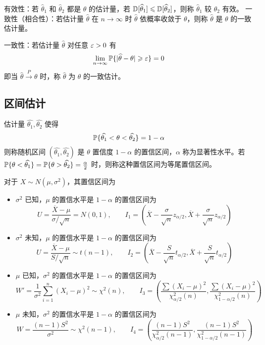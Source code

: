 有效性：若 $\widehat{\theta}_1$ 和 $\widehat{\theta}_2$ 都是 $\theta$ 的估计量，若 $\mathbb{D}[\widehat{\theta}_1] \leqslant \mathbb{D}[\widehat{\theta}_2]$，则称 $\widehat{\theta}_1$ 较 $\widehat{\theta}_2$ 有效。
一致性（相合性）：若估计量 $\widehat{\theta}$ 在 $n \to \infty$ 时 $\widehat{\theta}$ 依概率收敛于 $\theta$，则称 $\widehat{\theta}$ 是 $\theta$ 的一致估计量。

一致性：若估计量 $\widehat{\theta}$ 对任意 $\varepsilon > 0$ 有
\[ \lim_{n \to \infty} \mathbb{P}\{|\widehat{\theta}-\theta| \geqslant \varepsilon\} = 0 \]
即当 $\widehat{\theta} \stackrel{P}{\longrightarrow} \theta$ 时，称 $\widehat{\theta}$ 为 $\theta$ 的一致估计。

\subsection{区间估计}

估计量 $\widehat{\theta_1}, \widehat{\theta_2}$ 使得
\[ \mathbb{P}\{\widehat{\theta_1} < \theta < \widehat{\theta_2}\} = 1-\alpha \]
则称随机区间 $(\widehat{\theta_1}, \widehat{\theta_2})$ 是 $\theta$ 置信度 $1-\alpha$ 的置信区间，$\alpha$ 称为显著性水平。若 $\mathbb{P}\{\theta < \widehat{\theta_1}\} = \mathbb{P}\{\theta > \widehat{\theta_2}\} = \frac{\alpha}{2}$ 时，则称这种置信区间为等尾置信区间。

对于 $X \sim N(\mu,\sigma^2)$，其置信区间为
\begin{itemize}
	\item $\sigma^2$ 已知，$\mu$ 的置信水平是 $1-\alpha$ 的置信区间为
	      \[ U = \frac{\overline{X} - \mu}{\sigma/\sqrt{n}} = N(0, 1), \qquad
		      I_1 = \left(\overline{X} - \frac{\sigma}{\sqrt{n}} z_{\alpha/2},\overline{X} + \frac{\sigma}{\sqrt{n}} z_{\alpha/2} \right) \]
	\item $\sigma^2$ 未知，$\mu$ 的置信水平是 $1-\alpha$ 的置信区间为
	      \[ U = \frac{\overline{X} - \mu}{S/\sqrt{n}} \sim t(n-1), \qquad
		      I_2 = \left(\overline{X} - \frac{S}{\sqrt{n}} t_{\alpha/2},\overline{X} + \frac{S}{\sqrt{n}} t_{\alpha/2} \right) \]
	\item $\mu$ 已知，$\sigma^2$ 的置信水平是 $1-\alpha$ 的置信区间为
	      \[ W' = \frac{1}{\sigma^2}\sum_{i=1}^n (X_i - \mu)^2\sim \chi^2(n), \qquad
		      I_3 = \left(\frac{\sum (X_i - \mu)^2}{\chi^2_{\alpha/2}(n)} , \frac{\sum (X_i - \mu)^2}{\chi^2_{1-\alpha/2}(n)} \right) \]
	\item $\mu$ 未知，$\sigma^2$ 的置信水平是 $1-\alpha$ 的置信区间为
	      \[ W = \frac{(n-1)S^2}{\sigma^2} \sim \chi^2(n-1), \qquad
		      I_4 = \left(\frac{(n-1)S^2}{\chi^2_{\alpha/2}(n-1)} , \frac{(n-1)S^2}{\chi^2_{1-\alpha/2}(n-1)} \right) \]
\end{itemize}

